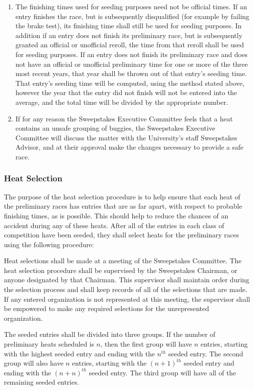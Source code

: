 \begin{enumerate}
		\item The finishing times used for seeding purposes need not be official times. If an entry finishes the race, but is subsequently disqualified (for example by failing the brake test), its finishing time shall still be used for seeding purposes. In addition if an entry does not finish its preliminary race, but is subsequently granted an official or unofficial reroll, the time from that reroll shall be used for seeding purposes. If an entry does not finish its preliminary race and does not have an official or unofficial preliminary time for one or more of the three most recent years, that year shall be thrown out of that entry's seeding time. That entry's seeding time will be computed, using the method stated above, however the year that the entry did not finish will not be entered into the average, and the total time will be divided by the appropriate number.

		\item If for any reason the Sweepstakes Executive Committee feels that a heat contains an unsafe grouping of buggies, the Sweepstakes Executive Committee will discuss the matter with the University's staff Sweepstakes Advisor, and at their approval make the changes necessary to provide a safe race.
	\end{enumerate}

\subsubsection{Heat Selection}
The purpose of the heat selection procedure is to help ensure that each heat of the preliminary races has entries that are as far apart, with respect to probable finishing times, as is possible. This should help to reduce the chances of an accident during any of these heats. After all of the entries in each class of competition have been seeded, they shall select heats for the preliminary races using the following procedure:

Heat selections shall be made at a meeting of the Sweepstakes Committee. The heat selection procedure shall be supervised by the Sweepstakes Chairman, or anyone designated by that Chairman. This supervisor shall maintain order during the selection process and shall keep records of all of the selections that are made. If any entered organization is not represented at this meeting, the supervisor shall be empowered to make any required selections for the unrepresented organization.

The seeded entries shall be divided into three groups. If the number of preliminary heats scheduled is $n$, then the first group will have $n$ entries, starting with the highest seeded entry and ending with the $n^{th}$ seeded entry. The second group will also have $n$ entries, starting with the $(n+1)^{th}$ seeded entry and ending with the $(n+n)^{th}$ seeded entry. The third group will have all of the remaining seeded entries.

